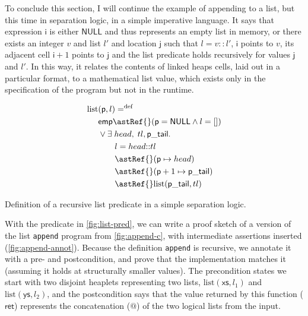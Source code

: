To conclude this section, I will continue the example of appending to a list,
but this time in separation logic, in a simple imperative language. It says
that expression $\mathsf{i}$ is either $\mathsf{NULL}$ and thus represents an
empty list in memory, or there exists an integer $v$ and list $l'$ and location
$\mathsf{j}$ such that $l = v {:}{:} l'$, $\mathsf{i}$ points to $v$, its
adjacent cell $\mathsf{i}+1$ points to $\mathsf{j}$ and the list predicate
holds recursively for values $\mathsf{j}$ and $l'$. In this way, it relates the
contents of linked heaps cells, laid out in a particular format, to a
mathematical list  value, which exists only in the specification
of the program but not in the runtime.

\begin{marginfigure}
    \centering
    \begin{align*}
        \mathrm{list} &(\mathsf{p}, l) \mathrel{{=}^\mathrm{def}} \\
                      &\mathsf{emp} \astRef{} (\mathsf{p} = \mathsf{NULL} \wedge{} l = []) \\
                      &\vee{} \exists{} \; {head}, \; {tl}, \mathsf{p\_tail}.\\
                      &\qquad l = {head} {:}{:} {tl} \\
                      &\qquad \astRef{} (\mathsf{p} \mapsto{} {head}) \\
                      &\qquad \astRef{} (\mathsf{p} + 1 \mapsto{} \mathsf{p\_tail}) \\
                      &\qquad \astRef{} \mathrm{list} (\mathsf{p\_tail}, {tl})
    \end{align*}
    \caption{Definition of a recursive list predicate in a simple separation
        logic.}\label{fig:list-pred}
\end{marginfigure}

With the predicate in \cref{fig:list-pred}, we can write a proof sketch of a
version of the list \texttt{append} program from \cref{fig:append-c},
with intermediate assertions inserted (\cref{fig:append-annot}). Because the
definition \texttt{append} is recursive, we annotate it with a pre-
and postcondition, and prove that the implementation matches it (assuming it
holds at structurally smaller values). The precondition states we start with
two disjoint heaplets representing two  lists,
$\mathrm{list}(\mathsf{xs}, l_1)$ and $\mathrm{list}(\mathsf{ys}, l_2)$, and
the postcondition says that the value returned by this function
($\mathsf{ret}$) represents the concatenation ($@$) of the two logical lists
from the input.

